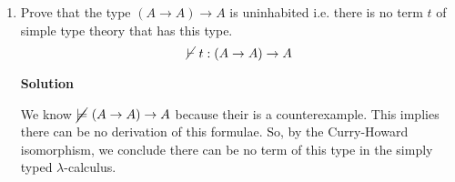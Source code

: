\documentclass[11pt]{report}
\begin{document}
\begin{enumerate}
		{\bf Solution:}

		The natural deduction proof stated in the question corresponds to the following type construction:

		\begin{center}
			$\begin{array}{c}		
				\infer[\lambda, 1]{\lambda x : A \times B. \ \FST (\SND x, \FST x) \ : \ A \times B \to B}
					{\infer[\FST]{B}
					{\infer[\times]{B \times A}
						{\infer[\SND]{B}{\infer[1]{p \ : \ A \times B}{}} 
						\hspace{0.5cm}	&	\hspace{0.5cm}
						\infer[\FST]{A}{\infer[1]{p \ : \ A \times B}{}}}}}
			\end{array}$
		\end{center}

		The corresponding proof-object is $$\lambda x : A \times B. \ \FST (\SND x, \FST x) \ : \ A \times B \to B$$

		Which can be $ B$-reduced to $$\lambda x : A \times B. \ \SND x \ : \ A \times B \to B$$

		This proof-object takes in a pair and returns the second of the pair. 
		
		As a natural deduction this corresponds to the following: 

		\begin{center}
			$\begin{array}{c}		
				\infer[\to, 1]{A \land B \to B}
					{\infer[\land E_{R}]{B}
						{\infer[1]{A \land B}
							{}}}
			\end{array}$
		\end{center}

		This simplified program corresponds to a shorter proof. In this sense $ B$-reduction (i.e. computation!) is related to the simplification of proofs.  

	\newpage
	\item Prove that the type $(A \to A) \to A$ is uninhabited i.e. there is no term $t$ of simple type theory that has this type.
	$$ \cancel{\vdash} \ t : (A \to A) \to A$$

	{\bf Solution}
		
		We know $ \cancel{\models} \ (A \to A) \to A$ because their is a counterexample. This implies there can be no derivation of this formulae. So, by the Curry-Howard isomorphism, we conclude there can be no term of this type in the simply typed $\lambda$-calculus. 		

	 
\end{enumerate}
	
\end{document}
